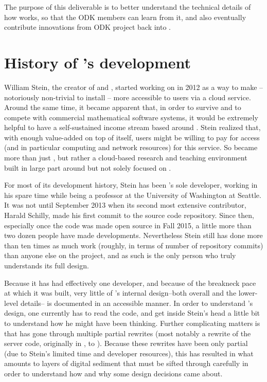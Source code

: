 \documentclass{deliverablereport}
\renewcommand{\SMC}{\software{SMC}}
\begin{document}
The purpose of this deliverable is to better understand the technical details
of how \SMC works, so that the ODK members can learn from it, and also
eventually contribute innovations from ODK project back into \SMC.

\section{History of \SMC's development}

William Stein, the creator of \Sage and \SMC, started working on \SMC in 2012
as a way to make \Sage -- notoriously non-trivial to install -- more accessible to
users via a cloud service.  Around the same time, it became apparent that, in
order to survive and to compete with commercial mathematical software systems,
it would be extremely helpful to have a self-sustained income stream based
around \Sage.  Stein realized that, with enough value-added on top of \Sage
itself, users might be willing to pay for access (and in particular computing
and network resources) for this service.  So \SMC became more than just \Sage,
but rather a cloud-based research and teaching environment built in large part
around but not solely focused on \Sage.

For most of its development history, Stein has been \SMC's sole developer,
working in his spare time while being a professor at the University of Washington at
Seattle.  It was not until September 2013 when its second most extensive
contributor, Harald Schilly, made his first commit to the \SMC source code
repository.  Since then, especially once the code was made open source
in Fall 2015, a
little more than two dozen people have made developments. Nevertheless Stein
still has done more than ten times as much work (roughly, in terms of number of
repository commits) than anyone else on the project, and as such is the only
person who truly understands its full design.

Because it has had effectively one developer, and because of the breakneck pace
at which it was built, very little of \SMC's internal design--both overall and
the lower-level details-- is documented in an accessible manner.  In order to
understand \SMC's design, one currently has to read the code, and get inside
Stein's head a little bit to understand how he might have been thinking.
Further complicating matters is that \SMC has gone through multiple partial
rewrites (most notably a rewrite of the server code, originally in \Python, to
\JavaScript).  Because these rewrites have been only partial (due to Stein's
limited time and developer resources), this has resulted in what amounts to
layers of digital sediment that must be sifted through carefully in order
to understand how and why some design decisions came about.
\end{document}
